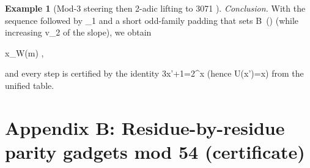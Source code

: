 \documentclass[11pt,letterpaper]{amsart}
\def\({}%
\def\){}%
\def\[{ }%
\def\]{ }%
\theoremstyle{definition}
\newtheorem{example}{Example}
\theoremstyle{plain}
\theoremstyle{plain}
\theoremstyle{remark}
\begin{document}
\begin{example}[Mod-3 steering then 2-adic lifting to \(3071 \)]
\emph{Conclusion.}
With the sequence \(\psi\) followed by \(\Omega_1\) and a short odd-family padding that sets \(B\ ()\) (while increasing \(v_2\) of the slope), we obtain
\[
x_W(m) ,
\]
and every step is certified by the identity \(3x'+1=2^{\alpha}x\) (hence \(U(x')=x\)) from the unified table.
\end{example}





\section*{Appendix B: Residue-by-residue parity gadgets mod 54 (certificate)}
\label{app:mod54-certificate}

\end{document}
